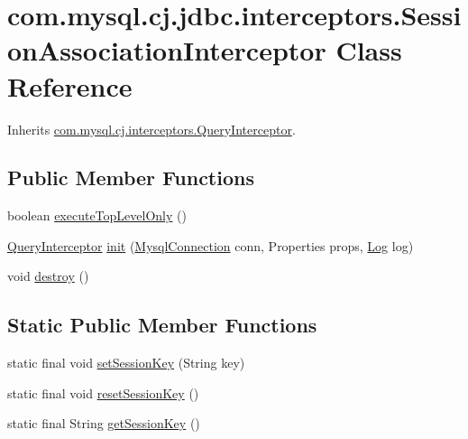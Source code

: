 \hypertarget{classcom_1_1mysql_1_1cj_1_1jdbc_1_1interceptors_1_1_session_association_interceptor}{}\section{com.\+mysql.\+cj.\+jdbc.\+interceptors.\+Session\+Association\+Interceptor Class Reference}
\label{classcom_1_1mysql_1_1cj_1_1jdbc_1_1interceptors_1_1_session_association_interceptor}


Inherits \mbox{\hyperlink{interfacecom_1_1mysql_1_1cj_1_1interceptors_1_1_query_interceptor}{com.\+mysql.\+cj.\+interceptors.\+Query\+Interceptor}}.

\subsection*{Public Member Functions}
\begin{DoxyCompactItemize}
\item 
boolean \mbox{\hyperlink{classcom_1_1mysql_1_1cj_1_1jdbc_1_1interceptors_1_1_session_association_interceptor_a86d3be9b55a93bb96f17d85e39e623c9}{execute\+Top\+Level\+Only}} ()
\item 
\mbox{\hyperlink{interfacecom_1_1mysql_1_1cj_1_1interceptors_1_1_query_interceptor}{Query\+Interceptor}} \mbox{\hyperlink{classcom_1_1mysql_1_1cj_1_1jdbc_1_1interceptors_1_1_session_association_interceptor_af6940dabb40c900b336fb6f5761160b6}{init}} (\mbox{\hyperlink{interfacecom_1_1mysql_1_1cj_1_1_mysql_connection}{Mysql\+Connection}} conn, Properties props, \mbox{\hyperlink{interfacecom_1_1mysql_1_1cj_1_1log_1_1_log}{Log}} log)
\item 
void \mbox{\hyperlink{classcom_1_1mysql_1_1cj_1_1jdbc_1_1interceptors_1_1_session_association_interceptor_a2bbe0b1b240f2ab943ba68fe979cf3a9}{destroy}} ()
\end{DoxyCompactItemize}
\subsection*{Static Public Member Functions}
\begin{DoxyCompactItemize}
\item 
static final void \mbox{\hyperlink{classcom_1_1mysql_1_1cj_1_1jdbc_1_1interceptors_1_1_session_association_interceptor_a5a4578dc1324a1dc1a010deb257e7311}{set\+Session\+Key}} (String key)
\item 
static final void \mbox{\hyperlink{classcom_1_1mysql_1_1cj_1_1jdbc_1_1interceptors_1_1_session_association_interceptor_ae4221ef68dac0b6de35cf46023db0c72}{reset\+Session\+Key}} ()
\item 
static final String \mbox{\hyperlink{classcom_1_1mysql_1_1cj_1_1jdbc_1_1interceptors_1_1_session_association_interceptor_adbf840ce7adf4bbc54efc2fa4d6a9987}{get\+Session\+Key}} ()
\end{DoxyCompactItemize}
